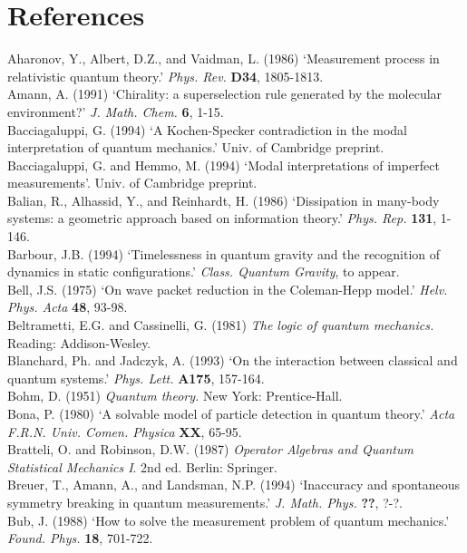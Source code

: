  \section*{References}
  Aharonov, Y.,  Albert, D.Z., and  Vaidman, L. (1986)
`Measurement process in relativistic quantum theory.' {\em Phys. Rev.} {\bf
D34}, 1805-1813.\\
 Amann, A. (1991) `Chirality: a superselection rule generated by the molecular
environment?'
{\em  J.
Math. Chem.} {\bf 6},   1-15.\\
Bacciagaluppi, G. (1994) `A Kochen-Specker contradiction in the modal
interpretation of quantum
mechanics.' Univ. of Cambridge preprint.\\
Bacciagaluppi, G. and Hemmo, M. (1994) `Modal interpretations of imperfect
measurements'.
 Univ. of Cambridge preprint.\\
 Balian, R.,  Alhassid, Y., and  Reinhardt, H. (1986) `Dissipation in many-body
systems: a geometric approach based on information theory.' {\em Phys. Rep.}
{\bf 131},  1-146.\\
Barbour, J.B. (1994) `Timelessness in quantum gravity and the recognition of
dynamics in static
configurations.' {\em Class. Quantum Gravity}, to appear.\\
Bell, J.S. (1975) `On wave packet reduction in the Coleman-Hepp model.'   {\em
Helv. Phys. Acta} {\bf
48},
 93-98. \\
  Beltrametti, E.G. and  Cassinelli, G. (1981) {\em The logic of quantum
mechanics.}
 Reading: Addison-Wesley.\\
Blanchard, Ph. and Jadczyk, A. (1993) `On the interaction between classical and
quantum systems.'
{\em Phys. Lett.} {\bf A175}, 157-164.\\
  Bohm, D. (1951) {\em Quantum theory.} New York: Prentice-Hall.\\
  Bona, P. (1980)  `A solvable model of
particle detection in quantum theory.' {\em Acta F.R.N. Univ. Comen. Physica}
{\bf XX}, 65-95.\\
Bratteli,  O. and Robinson, D.W. (1987) {\em Operator Algebras and
Quantum Statistical Mechanics I}. 2nd ed. Berlin: Springer.\\
Breuer, T., Amann, A., and Landsman, N.P. (1994) `Inaccuracy and spontaneous
symmetry breaking in
quantum measurements.' {\em J. Math. Phys.} {\bf ??}, ?-?.\\
 Bub,  J. (1988)  `How to solve the measurement problem of quantum mechanics.'
{\em Found. Phys.}
{\bf  18},  701-722.\\
